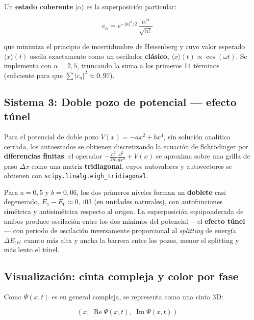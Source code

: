 \documentclass[12pt, a4paper]{article}
\begin{document}
Un \textbf{estado coherente} $|\alpha\rangle$ es la superposición
particular:

\begin{equation}
  c_n = e^{-|\alpha|^2/2}\,\frac{\alpha^n}{\sqrt{n!}}
  \label{eq:estado_coherente}
\end{equation}

que minimiza el principio de incertidumbre de Heisenberg y cuyo valor
esperado $\langle x\rangle(t)$ oscila exactamente como un oscilador
\textbf{clásico}, $\langle x\rangle(t) \propto \cos(\omega t)$. Se
implementa con $\alpha = 2{,}5$, truncando la suma a los primeros 14
términos (suficiente para que $\sum|c_n|^2 \approx 0{,}97$).

\subsection{Sistema 3: Doble pozo de potencial — efecto túnel}

Para el potencial de doble pozo $V(x) = -ax^2+bx^4$, sin solución
analítica cerrada, los autoestados se obtienen discretizando la
ecuación de Schrödinger por \textbf{diferencias finitas}: el operador
$-\frac{\hbar^2}{2m}\frac{d^2}{dx^2}+V(x)$ se aproxima sobre una
grilla de paso $\Delta x$ como una matriz \textbf{tridiagonal}, cuyos
autovalores y autovectores se obtienen con
\texttt{scipy.linalg.eigh\_tridiagonal}.

Para $a=0{,}5$ y $b=0{,}06$, los dos primeros niveles forman un
\textbf{doblete} casi degenerado, $E_1-E_0 \approx 0{,}103$ (en
unidades naturales), con autofunciones simétrica y antisimétrica
respecto al origen. La superposición equiponderada de ambos produce
oscilación entre los dos mínimos del potencial —el \textbf{efecto
túnel}— con periodo de oscilación inversamente proporcional al
\textit{splitting} de energía $\Delta E_{10}$: cuanto más alta y ancha
la barrera entre los pozos, menor el splitting y más lento el túnel.

\subsection{Visualización: cinta compleja y color por fase}

Como $\Psi(x,t)$ es en general compleja, se representa como una cinta
3D:

\begin{equation}
  (x,\; \operatorname{Re}\Psi(x,t),\; \operatorname{Im}\Psi(x,t))
  \label{eq:cinta_compleja}
\end{equation}
\end{document}
